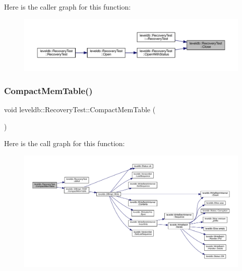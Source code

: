 Here is the caller graph for this function\+:
\nopagebreak
\begin{figure}[H]
\begin{center}
\leavevmode
\includegraphics[width=350pt]{classleveldb_1_1_recovery_test_a65077ffc562d9d4c5434166068836cbb_icgraph}
\end{center}
\end{figure}
\mbox{\label{classleveldb_1_1_recovery_test_ae356f5bfb63f57c36ce5763c8bf82495}} 
\subsubsection{\texorpdfstring{CompactMemTable()}{CompactMemTable()}}
{\footnotesize\ttfamily void leveldb\+::\+Recovery\+Test\+::\+Compact\+Mem\+Table (\begin{DoxyParamCaption}{ }\end{DoxyParamCaption})\hspace{0.3cm}{\ttfamily [inline]}}

Here is the call graph for this function\+:
\nopagebreak
\begin{figure}[H]
\begin{center}
\leavevmode
\includegraphics[width=350pt]{classleveldb_1_1_recovery_test_ae356f5bfb63f57c36ce5763c8bf82495_cgraph}
\end{center}
\end{figure}
\mbox{\label{classleveldb_1_1_recovery_test_a5b0e79e644c07cd5e1a130268e93c35e}} 
